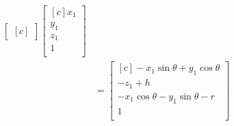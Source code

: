 \documentclass[onecolumn,10pt]{jhwhw}
\def\du#1{\underline{\underline{#1}}}
\begin{document}
\begin{align*}
\begin{bmatrix*}[c]
\end{bmatrix*}
\begin{bmatrix*}[c]
x_1 \\
y_1 \\
z_1 \\
1 \\
\end{bmatrix*} \\
&=
\begin{bmatrix*}[c]
    -x_1 \sin \theta + y_1 \cos \theta \\
                              -z_1 + h \\
-x_1 \cos \theta - y_1 \sin \theta - r \\
                                     1 \\
\end{bmatrix*}
\end{align*}

\end{document}
